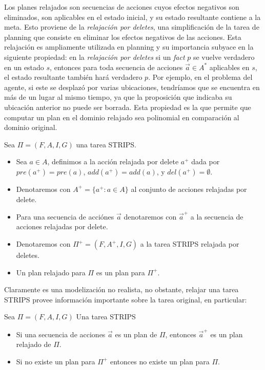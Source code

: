 Los planes relajados son secuencias de acciones cuyos efectos negativos son
eliminados, son aplicables en el estado inicial, y su estado resultante contiene
a la meta. Esto proviene de la \emph{relajación por deletes}, una simplificación
de la tarea de planning que consiste en eliminar los efectos negativos de las
acciones. Esta relajación es ampliamente utilizada en planning y su importancia
subyace en la siguiente propiedad: en la \emph{relajación por deletes} si un
\emph{fact} $p$ se vuelve verdadero en un estado $s$, entonces para toda
secuencia de acciones $\vec{a} \in A^{*}$ aplicables en $s$, el estado
resultante también hará verdadero $p$. Por ejemplo, en el problema del agente,
si este se desplazó por varias ubicaciones, tendríamos que se encuentra en más
de un lugar al mismo tiempo, ya que la proposición que indicaba su ubicación
anterior no puede ser borrada. Esta propiedad es la que permite que computar un
plan en el dominio relajado sea polinomial en comparación al dominio original.

\begin{mydef}
    Sea $\Pi = (F, A, I, G)$ una tarea STRIPS.
    \begin{itemize}
        \item Sea $a \in A$, definimos a la acción relajada por delete $a^{+}$
        dada por $pre(a^{+}) = pre(a)$, $add(a^{+}) = add(a)$, y $del(a^{+}) =
        \emptyset$.

        \item Denotaremos con $A^{+} = \{a^{+} : a \in A\}$ al conjunto de
        acciones relajadas por delete.

        \item Para una secuencia de acciónes $\vec{a}$ denotaremos con
        $\vec{a}^{+}$ a la secuencia de acciones relajadas por delete.

        \item Denotaremos con $\Pi^{+} = (F, A^{+}, I, G)$ a la tarea STRIPS
        relajada por deletes.

        \item Un plan relajado para $\Pi$ es un plan para $\Pi^{+}$.
    \end{itemize}
\end{mydef}

Claramente es una modelización no realista, no obstante, relajar una tarea
STRIPS provee información importante sobre la tarea original, en particular:

\begin{lemma}
\label{lit:delete_relaxed_property}
Sea $\Pi = (F, A, I, G)$ Una tarea STRIPS
\begin{itemize}
    \item Si una secuencia de acciones $\vec{a}$ es un plan de $\Pi$, entonces
    $\vec{a}^{+}$ es un plan relajado de $\Pi$.
    \item Si no existe un plan para $\Pi^{+}$ entonces no existe un plan para
    $\Pi$.
\end{itemize}
\end{lemma}

